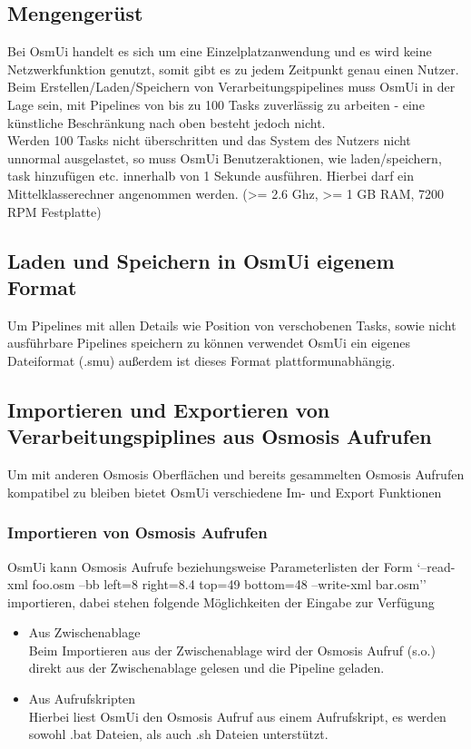 \documentclass[a4paper,12pt]{scrartcl}
\begin{document}
\subsection{Mengengerüst}
Bei OsmUi handelt es sich um eine Einzelplatzanwendung und es wird keine Netzwerkfunktion genutzt, somit gibt es zu jedem Zeitpunkt genau einen Nutzer.\\
Beim Erstellen/Laden/Speichern von Verarbeitungspipelines muss OsmUi in der Lage sein, mit Pipelines von bis zu 100 Tasks zuverlässig zu arbeiten -
eine künstliche Beschränkung nach oben besteht jedoch nicht.\\
Werden 100 Tasks nicht überschritten und das System des Nutzers nicht unnormal ausgelastet, so muss OsmUi Benutzeraktionen, wie laden/speichern, task hinzufügen etc.
innerhalb von 1 Sekunde ausführen. Hierbei darf ein Mittelklasserechner angenommen werden. (>= 2.6 Ghz, >= 1 GB RAM, 7200 RPM Festplatte)
\subsection{Laden und Speichern in OsmUi eigenem Format}
Um Pipelines mit allen Details wie Position von verschobenen Tasks, sowie nicht ausführbare Pipelines speichern zu können verwendet OsmUi ein eigenes Dateiformat
(.smu) außerdem ist dieses Format plattformunabhängig.

\subsection{Importieren und Exportieren von Verarbeitungspiplines aus Osmosis Aufrufen}
Um mit anderen Osmosis Oberflächen und bereits gesammelten Osmosis Aufrufen kompatibel zu bleiben bietet OsmUi verschiedene Im- und Export Funktionen
\subsubsection{Importieren von Osmosis Aufrufen}
OsmUi kann Osmosis Aufrufe beziehungsweise Parameterlisten der Form `--read-xml foo.osm --bb left=8 right=8.4 top=49 bottom=48 --write-xml bar.osm'' 
importieren, dabei stehen folgende Möglichkeiten der Eingabe zur Verfügung
\begin{itemize}
  \item Aus Zwischenablage\\
  Beim Importieren aus der Zwischenablage wird der Osmosis Aufruf (s.o.) direkt aus der Zwischenablage gelesen und die Pipeline geladen.
  \item Aus Aufrufskripten\\
  Hierbei liest OsmUi den Osmosis Aufruf aus einem Aufrufskript, es werden sowohl .bat Dateien, als auch .sh Dateien unterstützt.
\end{itemize}
\end{document}
